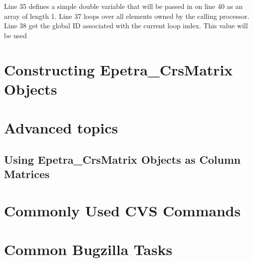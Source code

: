 \documentclass[12pt,relax]{EpetraUserGuide}
\newcommand{\crsmatrix}{Epetra\_CrsMatrix}
\begin{document}
Line 35 defines a simple double variable that will be passed in on
line 40 as an array of length 1.  Line 37 loops over all elements
owned by the calling processor.  Line 38 get the global ID associated
with the current loop index.  This value will be used 


\section{Constructing \crsmatrix{} Objects}
\label{Section:ConstructingCrsMatrices}

\section{ Advanced topics}
\subsection {Using \crsmatrix{} Objects as Column Matrices}

\clearpage



\appendix
\section{Commonly Used CVS Commands}
\label{Section:CVS}
\section{Common Bugzilla Tasks}
\label{Section:Bugzilla}
\end{document}

